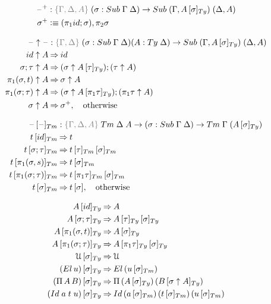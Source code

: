 \documentclass[a4paper,UKenglish,numberwithinsect,cleveref,thm-restate]{lipics-v2021}
\begin{document}
\begin{alignat*}{5}
  \blank^+ & : \implicit{\Gamma, \Delta, A}\; (\sigma : \Sub\;\Gamma\;\Delta) \to \Sub\;(\Gamma, \subTy{A}{\sigma})\;(\Delta, A) \\
  \sigma^+ & \defeq (\pi_1\idS; \sigma), \pi_2\sigma
\end{alignat*}

\begin{alignat*}{5}
  \blank\uparrow\blank & : \implicit{\Gamma, \Delta}\;(\sigma : \Sub\;\Gamma\;\Delta) (A : \Ty\;\Delta) \to \Sub\;(\Gamma, \subTy{A}{\sigma})\;(\Delta, A) \\
\idS                \uparrow A  & \reduce \idS \\
\sigma ; \tau       \uparrow A  & \reduce (\sigma \uparrow \subTy{A}{\tau}) ; (\tau \uparrow A) \\
\pi_1(\sigma, t)    \uparrow A  & \reduce \sigma \uparrow A \\
\pi_1(\sigma; \tau) \uparrow A  & \reduce (\sigma \uparrow \subTy{A}{\pi_1 \tau}) ; (\pi_1 \tau \uparrow A) \\
\sigma              \uparrow A  & \reduce \sigma^+,\quad  \text{otherwise}
\end{alignat*}

\begin{alignat*}{5}
  \subTm{\blank}{\blank}        & : \implicit{\Gamma, \Delta, A}\; \Tm\;\Delta\;A \to (\sigma : \Sub\;\Gamma\;\Delta) \to  \Tm\;\Gamma\;(\subTy{A}{\sigma}) \\
 \subTm{t}{\idS}                & \reduce t \\
 \subTm{t}{\sigma ; \tau}       & \reduce \subTm{\subTm{t}{\tau}}{\sigma} \\
 \subTm{t}{\pi_1(\sigma, s)}    & \reduce \subTm{t}{\sigma} \\
 \subTm{t}{\pi_1(\sigma; \tau)} & \reduce \subTm{\subTm{t}{\pi_1\tau}}{\sigma} \\
 \subTm{t}{\sigma}              & \reduce \sub{t}{\sigma}, \quad \text{otherwise}
\end{alignat*}

\begin{alignat*}{3}
  \subTy{A}{\idS}                & \reduce A \\
  \subTy{A}{\sigma ; \tau}       & \reduce \subTy{\subTy{A}{\tau}}{\sigma} \\
  \subTy{A}{\pi_1(\sigma, t)}    & \reduce \subTy{A}{\sigma} \\
  \subTy{A}{\pi_1(\sigma; \tau)} & \reduce \subTy{\subTy{A}{\pi_1\tau}}{\sigma} \\
  \subTy{\UU}{\sigma}            & \reduce \UU \\
  \subTy{(\El\, u)}{\sigma}      & \reduce \El\,(\subTm{u}{\sigma}) \\
  \subTy{(\Pi\,A\,B)}{\sigma}    & \reduce \Pi\,(\subTy{A}{\sigma})\,(\subTy{B}{\sigma\uparrow A}) \\
  \subTy{(\mathsf{Id}\;a\;t\;u)}{\sigma} & \reduce \mathsf{Id}\,(\subTm{a}{\sigma})\,(\subTm{t}{\sigma})\,(\subTm{u}{\sigma})
\end{alignat*}
\end{document}
